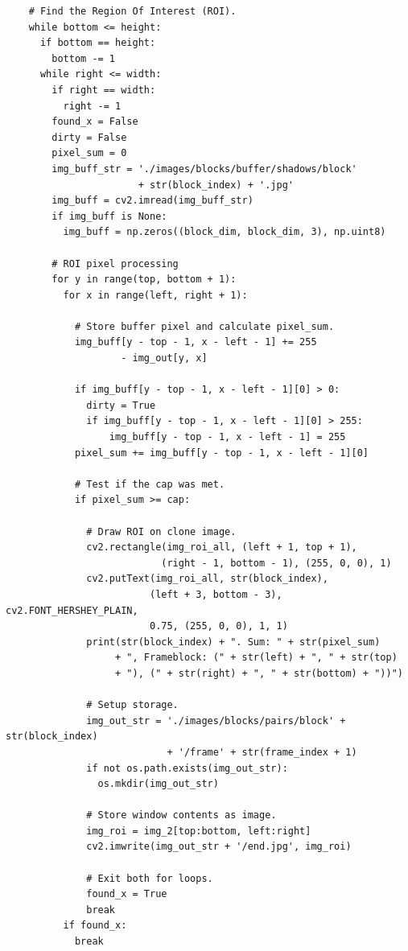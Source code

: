 \documentclass[conference]{IEEEtran}
\begin{document}
\begin{verbatim}
    # Find the Region Of Interest (ROI).
    while bottom <= height:
      if bottom == height:
        bottom -= 1
      while right <= width:
        if right == width:
          right -= 1
        found_x = False
        dirty = False
        pixel_sum = 0
        img_buff_str = './images/blocks/buffer/shadows/block'
                       + str(block_index) + '.jpg'
        img_buff = cv2.imread(img_buff_str)
        if img_buff is None:
          img_buff = np.zeros((block_dim, block_dim, 3), np.uint8)
        
        # ROI pixel processing
        for y in range(top, bottom + 1):
          for x in range(left, right + 1):

            # Store buffer pixel and calculate pixel_sum.
            img_buff[y - top - 1, x - left - 1] += 255
                    - img_out[y, x]

            if img_buff[y - top - 1, x - left - 1][0] > 0:
              dirty = True
              if img_buff[y - top - 1, x - left - 1][0] > 255:
                  img_buff[y - top - 1, x - left - 1] = 255
            pixel_sum += img_buff[y - top - 1, x - left - 1][0]
            
            # Test if the cap was met.
            if pixel_sum >= cap:

              # Draw ROI on clone image.
              cv2.rectangle(img_roi_all, (left + 1, top + 1),
                           (right - 1, bottom - 1), (255, 0, 0), 1)
              cv2.putText(img_roi_all, str(block_index),
                         (left + 3, bottom - 3), cv2.FONT_HERSHEY_PLAIN,
                         0.75, (255, 0, 0), 1, 1)
              print(str(block_index) + ". Sum: " + str(pixel_sum)
                   + ", Frameblock: (" + str(left) + ", " + str(top)
                   + "), (" + str(right) + ", " + str(bottom) + "))")
              
              # Setup storage.
              img_out_str = './images/blocks/pairs/block' + str(block_index)
                            + '/frame' + str(frame_index + 1)
              if not os.path.exists(img_out_str):
                os.mkdir(img_out_str)

              # Store window contents as image.
              img_roi = img_2[top:bottom, left:right]
              cv2.imwrite(img_out_str + '/end.jpg', img_roi)
              
              # Exit both for loops.
              found_x = True
              break
          if found_x:
            break


\end{verbatim}
\end{document}
